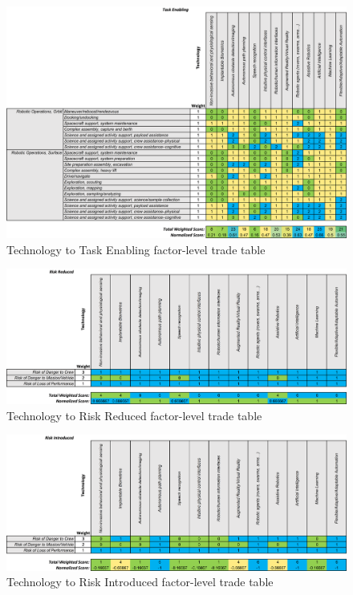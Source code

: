 \begin{figure}[b!]
    \begin{center}
        \includegraphics[width=0.8\linewidth]{figures/TradeStudy/figurea3.png}
        \caption{Technology to Task Enabling factor-level trade table}
    \end{center}
\end{figure}

\begin{figure}[b!]
    \begin{center}
        \includegraphics[width=0.8\linewidth]{figures/TradeStudy/figurea4.png}
        \caption{Technology to Risk Reduced factor-level trade table}
    \end{center}
\end{figure}

\begin{figure}[b!]
    \begin{center}
        \includegraphics[width=0.8\linewidth]{figures/TradeStudy/figurea5.png}
        \caption{Technology to Risk Introduced factor-level trade table}
    \end{center}
\end{figure}

